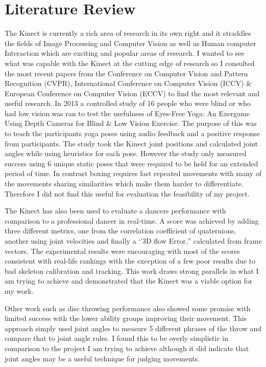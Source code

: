 \section{Literature Review}
The Kinect is currently a rich area of research in its own right and it straddles the fields of Image Processing and Computer Vision as well as Human computer Interaction which are exciting and popular areas of research. I wanted to see what was capable with the Kinect at the cutting edge of research so I consulted the most recent papers from the Conference on Computer Vision and Pattern Recognition (CVPR), International Conference on Computer Vision (ICCV) \& European Conference on Computer Vision (ECCV) to find the most relevant and useful research.
In 2013 a controlled study of 16 people who were blind or who had low vision was ran to test the usefulness of Eyes-Free Yoga: An Exergame Using Depth Cameras for Blind \& Low Vision Exercise. The purpose of this was to teach the participants yoga poses using audio feedback and a positive response from participants.\cite{Rector2013} The study took the Kinect joint positions and calculated joint angles while using heuristics for each pose. However the study only measured success using 6 unique static poses that were required to be held for an extended period of time. In contrast boxing requires fast repeated movements with many of the movements sharing similarities which make them harder to differentiate. Therefore I did not find this useful for evaluation the feasibility of my project.

The Kinect has also been used to evaluate a dancers performance with comparison to a professional dancer in real-time\cite{Alexiadis2011}. A score was achieved by adding three different metrics, one from the correlation coefficient of quaternions, another using joint velocities and finally a `'3D flow Error,'' calculated from frame vectors.\newline
The experimental results were encouraging with most of the scores consistent with real-life rankings with the exception of a few poor results due to bad skeleton calibration and tracking. This work draws strong parallels in what I am trying to achieve and demonstrated that the Kinect was a viable option for my work.

Other work such as disc throwing performance\cite{Yamaoka2013} also showed some promise with limited success with the lower ability groups improving their movement. This approach simply used joint angles to measure 5 different phrases of the throw and compare that to joint angle rules. I found this to be overly simplistic in comparison to the project I am trying to achieve although it did indicate that joint angles may be a useful technique for judging movements.



